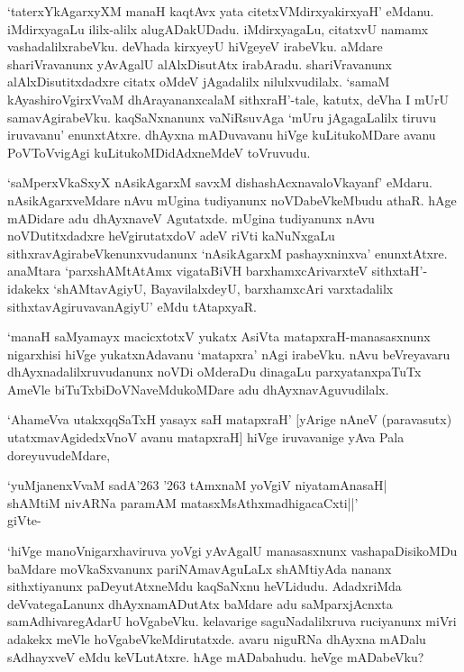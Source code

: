 `taterxYkAgarxyXM manaH kaqtAvx yata citetxVMdirxyakirxyaH' eMdanu. iMdirxyagaLu ililx-alilx alugADakUDadu. iMdirxyagaLu, citatxvU namamx vashadalilxrabeVku. deVhada kirxyeyU hiVgeyeV irabeVku. aMdare shariVravanunx yAvAgalU alAlxDisutAtx irabAradu. shariVravanunx alAlxDisutitxdadxre citatx oMdeV jAgadalilx nilulxvudilalx. `samaM kAyashiroVgirxVvaM dhArayananxcalaM sithxraH'-tale, katutx, deVha I mUrU samavAgirabeVku. kaqSaNxnanunx vaNiRsuvAga `mUru jAgagaLalilx tiruvu iruvavanu' enunxtAtxre. dhAyxna mADuvavanu hiVge kuLitukoMDare avanu PoVToVvigAgi kuLitukoMDidAdxneMdeV toVruvudu.

`saMperxVkaSxyX nAsikAgarxM savxM dishashAcxnavaloVkayanf' eMdaru. nAsikAgarxveMdare nAvu mUgina tudiyanunx noVDabeVkeMbudu athaR. hAge mADidare adu dhAyxnaveV Agutatxde. mUgina tudiyanunx nAvu noVDutitxdadxre heVgirutatxdoV adeV riVti kaNuNxgaLu sithxravAgirabeVkenunxvudanunx `nAsikAgarxM pashayxninxva' enunxtAtxre. anaMtara `parxshAMtAtAmx vigataBiVH barxhamxcArivarxteV sithxtaH'-idakekx `shAMtavAgiyU, BayavilalxdeyU, barxhamxcAri varxtadalilx sithxtavAgiruvavanAgiyU' eMdu tAtapxyaR.

`manaH saMyamayx macicxtotxV yukatx AsiVta matapxraH-manasasxnunx nigarxhisi hiVge yukatxnAdavanu `matapxra' nAgi irabeVku. nAvu beVreyavaru dhAyxnadalilxruvudanunx noVDi oMderaDu dinagaLu parxyatanxpaTuTx AmeVle biTuTxbiDoVNaveMdukoMDare adu dhAyxnavAguvudilalx.

`AhameVva utakxqqSaTxH yasayx saH matapxraH' [yArige nAneV (paravasutx) utatxmavAgidedxVnoV avanu matapxraH] hiVge iruvavanige yAva Pala doreyuvudeMdare,

\begin{shloka}
`yuMjanenxVvaM sadA\char'263 \char'263 tAmxnaM yoVgiV niyatamAnasaH|\\
shAMtiM nivARNa paramAM matasxMsAthxmadhigacaCxti||'\\
\hfill{giVte-}
\end{shloka}

`hiVge manoVnigarxhaviruva yoVgi yAvAgalU manasasxnunx vashapaDisikoMDu baMdare moVkaSxvanunx pariNAmavAguLaLx shAMtiyAda nananx sithxtiyanunx paDeyutAtxneMdu kaqSaNxnu heVLidudu. AdadxriMda deVvategaLanunx dhAyxnamADutAtx baMdare adu saMparxjAcnxta samAdhivaregAdarU hoVgabeVku. kelavarige saguNadalilxruva ruciyanunx miVri adakekx meVle hoVgabeVkeMdirutatxde. avaru niguRNa dhAyxna mADalu sAdhayxveV eMdu keVLutAtxre. hAge mADabahudu. heVge mADabeVku?


